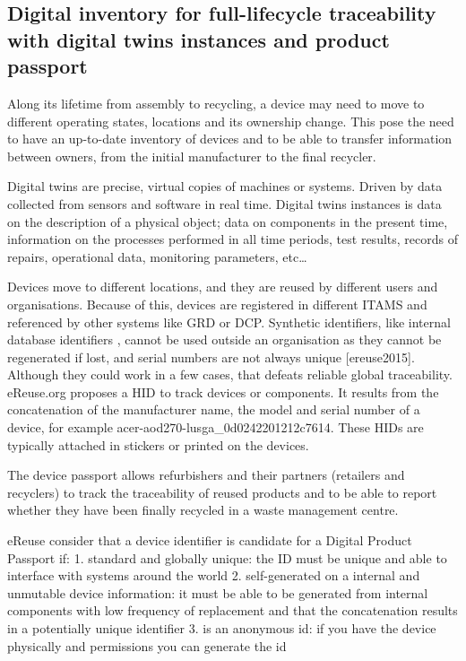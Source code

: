 \documentclass[
]{book}
\begin{document}
\hypertarget{digital-inventory-for-full-lifecycle-traceability-with-digital-twins-instances-and-product-passport}{%
\subsection{Digital inventory for full-lifecycle traceability with digital twins instances and product passport}\label{digital-inventory-for-full-lifecycle-traceability-with-digital-twins-instances-and-product-passport}}

Along its lifetime from assembly to recycling, a device may need to move to different operating states, locations and its ownership change. This pose the need to have an up-to-date inventory of devices and to be able to transfer information between owners, from the initial manufacturer to the final recycler.

Digital twins are precise, virtual copies of machines or systems. Driven by data collected from sensors and software in real time. Digital twins instances is data on the description of a physical object; data on components in the present time, information on the processes performed in all time periods, test results, records of repairs, operational data, monitoring parameters, etc\ldots{}

Devices move to different locations, and they are reused by different users and organisations. Because of this, devices are registered in different ITAMS and referenced by other systems like GRD or DCP. Synthetic identifiers, like internal database identifiers \citep{Waltermire2011}, cannot be used outside an organisation as they cannot be regenerated if lost, and serial numbers are not always unique {[}ereuse2015{]}. Although they could work in a few cases, that defeats reliable global traceability. eReuse.org proposes a HID to track devices or components. It results from the concatenation of the manufacturer name, the model and serial number of a device, for example acer-aod270-lusga\_0d0242201212c7614. These HIDs are typically attached in stickers or printed on the devices.

The device passport allows refurbishers and their partners (retailers and recyclers) to track the traceability of reused products and to be able to report whether they have been finally recycled in a waste management centre.

eReuse consider that a device identifier is candidate for a Digital Product Passport if: 1. standard and globally unique: the ID must be unique and able to interface with systems around the world 2. self-generated on a internal and unmutable device information: it must be able to be generated from internal components with low frequency of replacement and that the concatenation results in a potentially unique identifier 3. is an anonymous id: if you have the device physically and permissions you can generate the id
\end{document}
